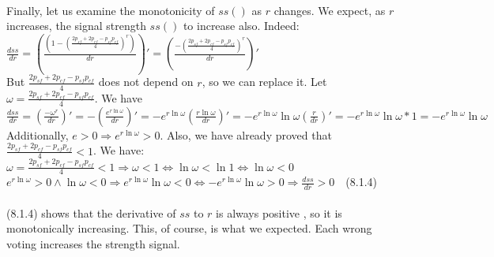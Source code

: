 \documentclass{article}
\begin{document}
\paragraph{ }
Finally, let us examine the monotonicity of $ss()$ as $r$ changes. We expect, as $r$ increases, the signal strength $ss()$ to increase also. Indeed:\\
 $\frac{dss}{dr}= (\frac{(1-(\frac{2p_{sf}+2p_{cf}-p_{sf}p_{cf}}{4})^r)}{dr})'=(\frac{-(\frac{2p_{sf}+2p_{cf}-p_{sf}p_{cf}}{4})^r}{dr})'$\\
 But $\frac{2p_{sf}+2p_{cf}-p_{sf}p_{cf}}{4}$ does not depend on $r$, so we can replace it. Let $\omega=\frac{2p_{sf}+2p_{cf}-p_{sf}p_{cf}}{4}$. We have\\
 $\frac{dss}{dr}=(\frac{-\omega^r}{dr})'=-(\frac{e^{r\ln{\omega}}}{dr})'=-e^{r\ln{\omega}}(\frac{r\ln{\omega}}{dr})'=-e^{r\ln{\omega}}\ln{\omega}(\frac{r}{dr})'=-e^{r\ln{\omega}}\ln{\omega}*1=-e^{r\ln{\omega}}\ln{\omega}$\\
Additionally, $e>0\Rightarrow e^{r\ln{\omega}}>0$. Also, we have already proved that  $\frac{2p_{sf}+2p_{cf}-p_{sf}p_{cf}}{4}<1$. We have:  $\omega=\frac{2p_{sf}+2p_{cf}-p_{sf}p_{cf}}{4}<1\Rightarrow \omega<1 \Leftrightarrow \ln{\omega}<\ln{1}\Leftrightarrow \ln{\omega}<0$\\
$e^{r\ln{\omega}}>0 \land \ln{\omega}<0 \Rightarrow e^{r\ln{\omega}}\ln{\omega}<0 \Leftrightarrow -e^{r\ln{\omega}}\ln{\omega}>0 \Rightarrow \frac{dss}{dr}>0$~~(8.1.4)\\
\\
(8.1.4) shows that the derivative of $ss$ to $r$ is always positive , so it is monotonically increasing. This, of course, is what we expected. Each wrong voting increases the strength signal.
\end{document}
